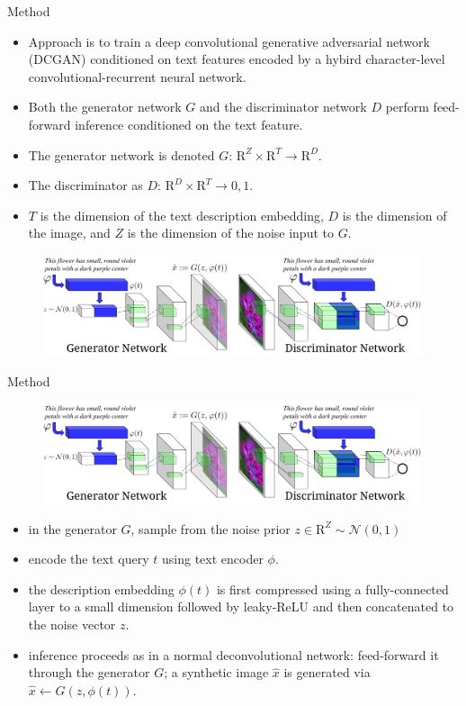 \documentclass[10pt]{beamer}
\begin{document}
	\begin{frame}{Method}
		\begin{itemize}
			\item Approach is to train a deep convolutional generative adversarial network (DCGAN) conditioned on text features encoded by a hybird character-level convolutional-recurrent neural network.
			\item Both the generator network $G$ and the discriminator network $D$ perform feed-forward inference conditioned on the text feature.
			\item The generator network is denoted $G$: $\mathrm{R}^Z\times\mathrm{R}^T\rightarrow\mathrm{R}^D$.
			\item The discriminator as $D$: $\mathrm{R}^D\times\mathrm{R}^T\rightarrow{0,1}$.
			\item $T$ is the dimension of the text description embedding, $D$ is the dimension of the image, and $Z$ is the dimension of the noise input to $G$.
		\end{itemize}
		\begin{figure}
			\includegraphics[width=30em]{figures/image-synthesis-structure.png}
		\end{figure}
	\end{frame}

	\begin{frame}[t]{Method}
		\begin{figure}
			\includegraphics[width=30em]{figures/image-synthesis-structure.png}
		\end{figure}
		\begin{itemize}
			\item in the generator $G$, sample from the noise prior $z\in\mathrm{R}^Z\sim\mathcal{N}(0,1)$
			\item encode the text query $t$ using text encoder $\phi$.
			\item the description embedding $\phi(t)$ is first compressed using a fully-connected layer to a small dimension followed by leaky-ReLU and then concatenated to the noise vector $z$.
			\item inference proceeds as in a normal deconvolutional network: feed-forward it through the generator $G$; a synthetic image $\hat{x}$ is generated via $\hat{x}\leftarrow G(z,\phi(t))$.
		\end{itemize} 
	\end{frame}
\end{document}
